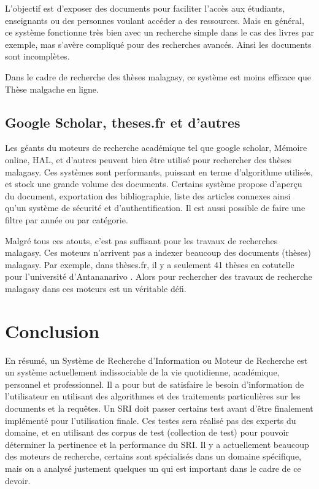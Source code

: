 L'objectif est d'exposer des documents pour faciliter l'accès aux étudiants, enseignants ou des personnes voulant accéder a des ressources. Mais en général, ce système fonctionne très bien avec un recherche simple dans le cas des livres par exemple, mas s'avère compliqué pour des recherches avancés. Ainsi les documents sont incomplètes. 

Dans le cadre de recherche des thèses malagasy, ce système est moins efficace que Thèse malgache en ligne.

\subsection{Google Scholar, theses.fr et d'autres}
Les géants du moteurs de recherche académique tel que google scholar, Mémoire online, HAL, et d'autres peuvent bien être utilisé pour rechercher des thèses malagasy. Ces systèmes sont performants, puissant en terme d'algorithme utilisés, et stock une grande volume des documents. Certains système propose d’aperçu du document, exportation des bibliographie, liste des articles connexes ainsi qu'un système de sécurité et d'authentification. Il est aussi possible de faire une filtre par année ou par catégorie.

Malgré tous ces atouts, c'est pas suffisant pour les travaux de recherches malagasy. Ces moteurs n'arrivent pas a indexer beaucoup des documents (thèses) malagasy. Par exemple, dans thèses.fr, il y a seulement 41 thèses en cotutelle pour l'université d'Antananarivo \citep{these-fr}. Alors pour rechercher des travaux de recherche malagasy dans ces moteurs est un véritable défi.

\section{Conclusion}
En résumé, un Système de Recherche d'Information ou Moteur de Recherche est un système actuellement indissociable de la vie quotidienne, académique, personnel et professionnel. Il a pour but de satisfaire le besoin d'information de l'utilisateur en utilisant des algorithmes et des traitements particulières sur les documents et la requêtes. Un SRI doit passer certains test avant d'être finalement implémenté pour l'utilisation finale. Ces testes sera réalisé pas des experts du domaine, et en utilisant des corpus de test (collection de test) pour pouvoir déterminer la pertinence et la performance du SRI. Il y a actuellement beaucoup des moteurs de recherche, certains sont spécialisés dans un domaine spécifique, mais on a analysé justement quelques un qui est important dans le cadre de ce devoir.
